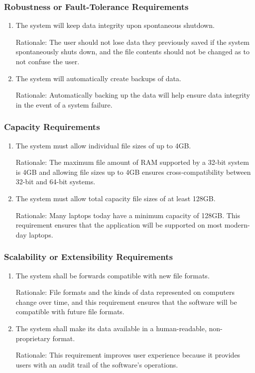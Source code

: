 \documentclass{article}
\begin{document}
\subsubsection{Robustness or Fault-Tolerance Requirements}
\begin{enumerate}[RFR1]
\item The system will keep data integrity upon spontaneous shutdown.

Rationale: The user should not lose data they previously saved if the system spontaneously shuts down, and the file contents should not be changed as to not confuse the user.
\item The system will automatically create backups of data.

Rationale: Automatically backing up the data will help ensure data integrity in the event of a system failure.
\end{enumerate}

\subsubsection{Capacity Requirements}
\begin{enumerate}[CR1]
\item The system must allow individual file sizes of up to 4GB.

Rationale: The maximum file amount of RAM supported by a 32-bit system is 4GB and allowing file sizes up to 4GB ensures cross-compatibility between 32-bit and 64-bit systems.
\item The system must allow total capacity file sizes of at least 128GB.

Rationale: Many laptops today have a minimum capacity of 128GB. This requirement ensures that the application will be supported on most modern-day laptops.
\end{enumerate}

\subsubsection{Scalability or Extensibility Requirements}
\begin{enumerate}[SER1]
\item The system shall be forwards compatible with new file formats.

Rationale: File formats and the kinds of data represented on computers change over time, and this requirement ensures that the software will be compatible with future file formats.
\item The system shall make its data available in a human-readable, non-proprietary format.

Rationale: This requirement improves user experience because it provides users with an audit trail of the software's operations.
\end{enumerate}
\end{document}

